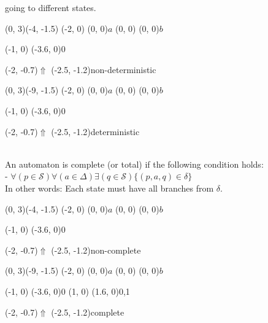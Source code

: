 \documentclass{article}
\begin{document}
  going to different states.\\
\begin{graph}(0, 3)(-4, -1.5)
  (-2, 0) (0, 0){$a$}
  (0, 0) (0, 0){$b$}

  (-1, 0) \freetext(-3.6, 0){0}
   

  \freetext(-2, -0.7){$\Uparrow$}
  \freetext(-2.5, -1.2){non-deterministic}
\end{graph}
\begin{graph}(0, 3)(-9, -1.5)
  (-2, 0) (0, 0){$a$}
  (0, 0) (0, 0){$b$}

  (-1, 0) \freetext(-3.6, 0){0}
   

  \freetext(-2, -0.7){$\Uparrow$}
  \freetext(-2.5, -1.2){deterministic}
\end{graph}
\\
An automaton is complete (or total) if the following condition holds:\\
- $\forall (p \in \mathcal{S}) \forall (a \in \Delta)
\exists (q \in \mathcal{S}) \{(p, a, q) \in \delta\}$\\
In other words: Each state must have all branches from $\delta$.\\
\begin{graph}(0, 3)(-4, -1.5)
  (-2, 0) (0, 0){$a$}
  (0, 0) (0, 0){$b$}

  (-1, 0) \freetext(-3.6, 0){0}
   

  \freetext(-2, -0.7){$\Uparrow$}
  \freetext(-2.5, -1.2){non-complete}
\end{graph}
\begin{graph}(0, 3)(-9, -1.5)
  (-2, 0) (0, 0){$a$}
  (0, 0) (0, 0){$b$}

  (-1, 0) \freetext(-3.6, 0){0}
  (1, 0) \freetext(1.6, 0){0,1}
   

  \freetext(-2, -0.7){$\Uparrow$}
  \freetext(-2.5, -1.2){complete}
\end{graph}
\end{document}
